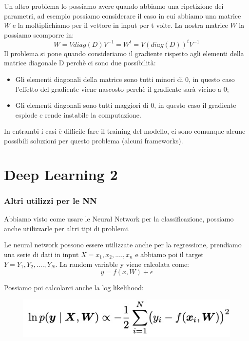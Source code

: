 \documentclass[14pt]{extreport}
\begin{document}
Un altro problema lo possiamo avere quando abbiamo una ripetizione dei parametri, ad esempio possiamo considerare il caso in cui abbiamo una matrice
$W$ e la moltiplichiamo per il vettore in input per t volte. La nostra matrice $W$ la possiamo scomporre in:
$$W = V diag(D) V^{-1} = W^{t} = V(diag(D))^tV^{-1}$$ Il problema si pone quando consideriamo il gradiente rispetto agli elementi della matrice
diagonale D perchè ci sono due possibilità:
\begin{itemize}
	\item Gli elementi diagonali della matrice sono tutti minori di 0, in questo caso l'effetto del gradiente viene nascosto perchè il gradiente sarà
	vicino a 0;
	\item Gli elementi diagonali sono tutti maggiori di 0, in questo caso il gradiente esplode e rende instabile la computazione.
\end{itemize}

In entrambi i casi è difficile fare il training del modello, ci sono comunque alcune possibili soluzioni per questo problema (alcuni frameworks).


\chapter{Deep Learning 2}

\subsection{Altri utilizzi per le NN}

Abbiamo visto come usare le Neural Network per la classificazione, possiamo anche utilizzarle per altri tipi di problemi.

Le neural network possono essere utilizzate anche per la regressione, prendiamo una serie di dati in input $X = {x_1, x_2,....,x_n}$ e abbiamo poi il
target $Y = {Y_1,Y_2,....,Y_N}$. La random variable y viene calcolata come: $$y = f(x,W) + \epsilon$$

Possiamo poi calcolarci anche la log likelihood:

\begin{figure}[H]
	\centering
	\includegraphics[width=0.7\linewidth]{402.jpeg}
\end{figure}
\end{document}
